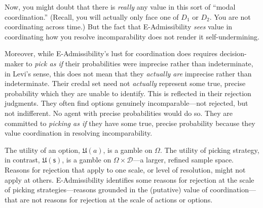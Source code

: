 \documentclass[a4paper]{article}
\newcommand\D{\mathcal{D}}
\newcommand\s{\mathsf{s}}
\newcommand\U{\mathfrak{U}} %
\newenvironment{CCM rewritten}
{\begingroup\color{blue}} %
{\endgroup}              %
\begin{document}
{{	
	
	Now, you might doubt that there is \textit{really} any value in this sort of ``modal coordination.'' (Recall, you will actually only face one of $D_1$ or $D_2$. You are not coordinating across time.) But the fact that E-Admissibility \textit{sees} value in coordinating how you resolve incomparability does not render it self-undermining.
	

Moreover, while E-Admissibility's lust for coordination does requires decision-maker to \textit{pick as if} their probabilities were imprecise rather than indeterminate, in Levi's sense, this does not mean that they \textit{actually are} imprecise rather than indeterminate. Their credal set need not \textit{actually} represent some true, precise probability which they are unable to identify. This is reflected in their rejection judgments. They often find options genuinely incomparable---not rejected, but not indifferent. No agent with precise probabilities would do so. They are committed to \textit{picking as if} they have some true, precise probability because they value coordination in resolving incomparability.

The utility of an option, $\U(a)$, is a gamble on $\Omega$. The utility of picking strategy, in contrast, $\U(\s)$, is a gamble on $\Omega\times\D$---a larger, refined sample space. Reasons for rejection that apply to one scale, or level of resolution, might not apply at others. E-Admissibility identifies some reasons for rejection at the scale of picking strategies---reasons grounded in the (putative) value of coordination---that are not reasons for rejection at the scale of actions or options. }

}
\end{document}
